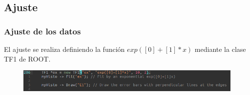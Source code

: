 \documentclass[xcolor=dvipsnames]{beamer}
\begin{document}
			\subsection{Ajuste}

			\begin{frame}
				\frametitle{Ajuste de los datos}

				El ajuste se realiza definiendo la función $exp([0]+[1]*x)$ mediante la clase TF1 de ROOT.
				\begin{figure}[H]
					\centering
					\includegraphics[scale=0.4]{Fotos/code.png}
				\end{figure}
			\end{frame}
\end{document}
